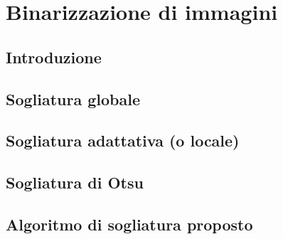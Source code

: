 \chapter{Binarizzazione di immagini}
\label{chap:image-binarization}

\section{Introduzione}
\section{Sogliatura globale}
\section{Sogliatura adattativa (o locale)}
\section{Sogliatura di Otsu}
\section{Algoritmo di sogliatura proposto}
